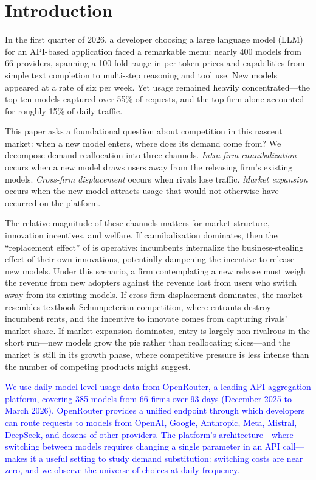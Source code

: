 \documentclass[11pt, a4paper]{article}
\begin{document}
\newpage

\section{Introduction}

In the first quarter of 2026, a developer choosing a large language model (LLM) for an API-based application faced a remarkable menu: nearly 400 models from 66 providers, spanning a 100-fold range in per-token prices and capabilities from simple text completion to multi-step reasoning and tool use. New models appeared at a rate of six per week. Yet usage remained heavily concentrated---the top ten models captured over 55\% of requests, and the top firm alone accounted for roughly 15\% of daily traffic.

This paper asks a foundational question about competition in this nascent market: when a new model enters, where does its demand come from? We decompose demand reallocation into three channels. \emph{Intra-firm cannibalization} occurs when a new model draws users away from the releasing firm's existing models. \emph{Cross-firm displacement} occurs when rivals lose traffic. \emph{Market expansion} occurs when the new model attracts usage that would not otherwise have occurred on the platform.

The relative magnitude of these channels matters for market structure, innovation incentives, and welfare. If cannibalization dominates, then the ``replacement effect'' of \citet{arrow1962economic} is operative: incumbents internalize the business-stealing effect of their own innovations, potentially dampening the incentive to release new models. Under this scenario, a firm contemplating a new release must weigh the revenue from new adopters against the revenue lost from users who switch away from its existing models. If cross-firm displacement dominates, the market resembles textbook Schumpeterian competition, where entrants destroy incumbent rents, and the incentive to innovate comes from capturing rivals' market share. If market expansion dominates, entry is largely non-rivalrous in the short run---new models grow the pie rather than reallocating slices---and the market is still in its growth phase, where competitive pressure is less intense than the number of competing products might suggest.

\textcolor{blue}{We use daily model-level usage data from OpenRouter, a leading API aggregation platform, covering 385 models from 66 firms over 93 days (December 2025 to March 2026). OpenRouter provides a unified endpoint through which developers can route requests to models from OpenAI, Google, Anthropic, Meta, Mistral, DeepSeek, and dozens of other providers. The platform's architecture---where switching between models requires changing a single parameter in an API call---makes it a useful setting to study demand substitution: switching costs are near zero, and we observe the universe of choices at daily frequency.}
\end{document}
